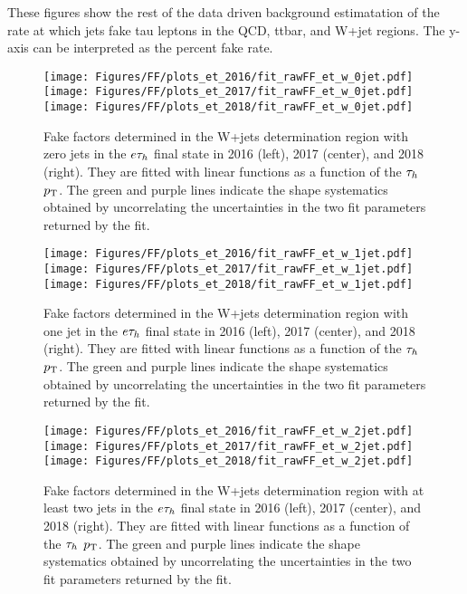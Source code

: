 These figures show the rest of the data driven background estimatation of the rate at which jets fake tau leptons in the QCD, ttbar, and W+jet regions. The y-axis can be interpreted as the percent fake rate. 

\begin{figure}[ht!b]
\centering
\texttt{[image: Figures/FF/plots\_et\_2016/fit\_rawFF\_et\_w\_0jet.pdf]}
\texttt{[image: Figures/FF/plots\_et\_2017/fit\_rawFF\_et\_w\_0jet.pdf]}
\texttt{[image: Figures/FF/plots\_et\_2018/fit\_rawFF\_et\_w\_0jet.pdf]}\\
\caption{\label{fig:fit_raw_et_0jet_w} Fake factors determined in the W+jets determination region with zero jets in the $e\tau_h$ final state in 2016 (left), 2017 (center), and 2018 (right). They are fitted with linear functions as a function of the $\tau_h$ $p_{\mathrm{T}}$. The green and purple lines indicate the shape systematics obtained by uncorrelating the uncertainties in the two fit parameters returned by the fit.  }
\end{figure}

\begin{figure}[ht!b]
\centering
\texttt{[image: Figures/FF/plots\_et\_2016/fit\_rawFF\_et\_w\_1jet.pdf]}
\texttt{[image: Figures/FF/plots\_et\_2017/fit\_rawFF\_et\_w\_1jet.pdf]}
\texttt{[image: Figures/FF/plots\_et\_2018/fit\_rawFF\_et\_w\_1jet.pdf]}\\
\caption{\label{fig:fit_raw_et_1jet_w} Fake factors determined in the W+jets determination region with one jet in the $e\tau_h$ final state in 2016 (left), 2017 (center), and 2018 (right). They are fitted with linear functions as a function of the $\tau_h$ $p_{\mathrm{T}}$. The green and purple lines indicate the shape systematics obtained by uncorrelating the uncertainties in the two fit parameters returned by the fit.  }
\end{figure}

\begin{figure}[ht!b]
\centering
\texttt{[image: Figures/FF/plots\_et\_2016/fit\_rawFF\_et\_w\_2jet.pdf]}
\texttt{[image: Figures/FF/plots\_et\_2017/fit\_rawFF\_et\_w\_2jet.pdf]}
\texttt{[image: Figures/FF/plots\_et\_2018/fit\_rawFF\_et\_w\_2jet.pdf]}\\
\caption{\label{fig:fit_raw_et_2jet_w} Fake factors determined in the W+jets determination region with at least two jets in the $e\tau_h$ final state in 2016 (left), 2017 (center), and 2018 (right). They are fitted with linear functions as a function of the $\tau_h$ $p_{\mathrm{T}}$. The green and purple lines indicate the shape systematics obtained by uncorrelating the uncertainties in the two fit parameters returned by the fit.  }
\end{figure}


